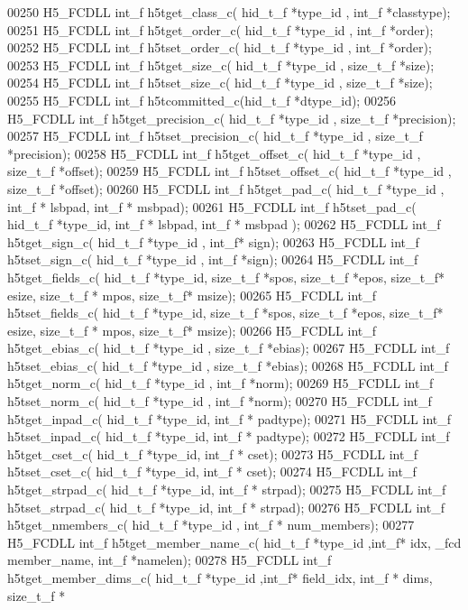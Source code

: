 \begin{DoxyCode}
00250 H5\_FCDLL int\_f h5tget\_class\_c( hid\_t\_f *type\_id , int\_f *classtype);
00251 H5\_FCDLL int\_f h5tget\_order\_c( hid\_t\_f *type\_id , int\_f *order);
00252 H5\_FCDLL int\_f h5tset\_order\_c( hid\_t\_f *type\_id , int\_f *order);
00253 H5\_FCDLL int\_f h5tget\_size\_c( hid\_t\_f *type\_id , size\_t\_f *size);
00254 H5\_FCDLL int\_f h5tset\_size\_c( hid\_t\_f *type\_id , size\_t\_f *size);
00255 H5\_FCDLL int\_f h5tcommitted\_c(hid\_t\_f *dtype\_id);
00256 H5\_FCDLL int\_f h5tget\_precision\_c( hid\_t\_f *type\_id , size\_t\_f *precision);
00257 H5\_FCDLL int\_f h5tset\_precision\_c( hid\_t\_f *type\_id , size\_t\_f *precision);
00258 H5\_FCDLL int\_f h5tget\_offset\_c( hid\_t\_f *type\_id , size\_t\_f *offset);
00259 H5\_FCDLL int\_f h5tset\_offset\_c( hid\_t\_f *type\_id , size\_t\_f *offset);
00260 H5\_FCDLL int\_f h5tget\_pad\_c( hid\_t\_f *type\_id , int\_f * lsbpad, int\_f * msbpad);
00261 H5\_FCDLL int\_f h5tset\_pad\_c( hid\_t\_f *type\_id, int\_f * lsbpad, int\_f * msbpad );
00262 H5\_FCDLL int\_f h5tget\_sign\_c( hid\_t\_f *type\_id , int\_f* sign);
00263 H5\_FCDLL int\_f h5tset\_sign\_c( hid\_t\_f *type\_id , int\_f *sign);
00264 H5\_FCDLL int\_f h5tget\_fields\_c( hid\_t\_f *type\_id, size\_t\_f *spos, size\_t\_f *epos, size\_t\_f* esize, size\_t\_f
      * mpos, size\_t\_f* msize);
00265 H5\_FCDLL int\_f h5tset\_fields\_c( hid\_t\_f *type\_id, size\_t\_f *spos, size\_t\_f *epos, size\_t\_f* esize, size\_t\_f
      * mpos, size\_t\_f* msize);
00266 H5\_FCDLL int\_f h5tget\_ebias\_c( hid\_t\_f *type\_id , size\_t\_f *ebias);
00267 H5\_FCDLL int\_f h5tset\_ebias\_c( hid\_t\_f *type\_id , size\_t\_f *ebias);
00268 H5\_FCDLL int\_f h5tget\_norm\_c( hid\_t\_f *type\_id , int\_f *norm);
00269 H5\_FCDLL int\_f h5tset\_norm\_c( hid\_t\_f *type\_id , int\_f *norm);
00270 H5\_FCDLL int\_f h5tget\_inpad\_c( hid\_t\_f *type\_id, int\_f * padtype);
00271 H5\_FCDLL int\_f h5tset\_inpad\_c( hid\_t\_f *type\_id, int\_f * padtype);
00272 H5\_FCDLL int\_f h5tget\_cset\_c( hid\_t\_f *type\_id, int\_f * cset);
00273 H5\_FCDLL int\_f h5tset\_cset\_c( hid\_t\_f *type\_id, int\_f * cset);
00274 H5\_FCDLL int\_f h5tget\_strpad\_c( hid\_t\_f *type\_id, int\_f * strpad);
00275 H5\_FCDLL int\_f h5tset\_strpad\_c( hid\_t\_f *type\_id, int\_f * strpad);
00276 H5\_FCDLL int\_f h5tget\_nmembers\_c( hid\_t\_f *type\_id , int\_f * num\_members);
00277 H5\_FCDLL int\_f h5tget\_member\_name\_c( hid\_t\_f *type\_id ,int\_f* idx, \_fcd member\_name, int\_f *namelen);
00278 H5\_FCDLL int\_f h5tget\_member\_dims\_c( hid\_t\_f *type\_id ,int\_f* field\_idx, int\_f * dims, size\_t\_f * 

\end{DoxyCode}
